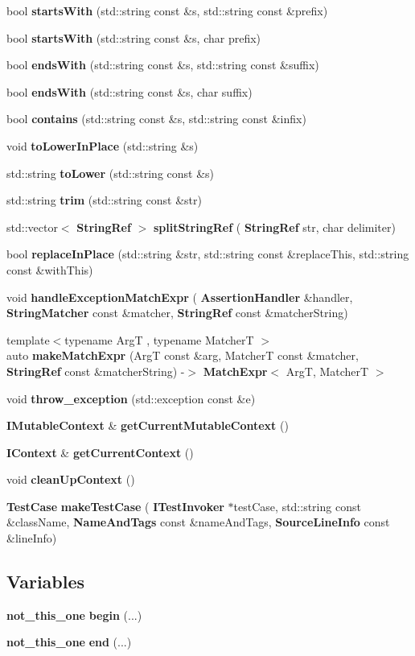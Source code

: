 \begin{DoxyCompactItemize}
bool \textbf{ starts\+With} (std\+::string const \&s, std\+::string const \&prefix)
\item 
bool \textbf{ starts\+With} (std\+::string const \&s, char prefix)
\item 
bool \textbf{ ends\+With} (std\+::string const \&s, std\+::string const \&suffix)
\item 
bool \textbf{ ends\+With} (std\+::string const \&s, char suffix)
\item 
bool \textbf{ contains} (std\+::string const \&s, std\+::string const \&infix)
\item 
void \textbf{ to\+Lower\+In\+Place} (std\+::string \&s)
\item 
std\+::string \textbf{ to\+Lower} (std\+::string const \&s)
\item 
std\+::string \textbf{ trim} (std\+::string const \&str)
\item 
std\+::vector$<$ \textbf{ String\+Ref} $>$ \textbf{ split\+String\+Ref} (\textbf{ String\+Ref} str, char delimiter)
\item 
bool \textbf{ replace\+In\+Place} (std\+::string \&str, std\+::string const \&replace\+This, std\+::string const \&with\+This)
\item 
void \textbf{ handle\+Exception\+Match\+Expr} (\textbf{ Assertion\+Handler} \&handler, \textbf{ String\+Matcher} const \&matcher, \textbf{ String\+Ref} const \&matcher\+String)
\item 
{\footnotesize template$<$typename ArgT , typename MatcherT $>$ }\\auto \textbf{ make\+Match\+Expr} (ArgT const \&arg, MatcherT const \&matcher, \textbf{ String\+Ref} const \&matcher\+String) -\/$>$ \textbf{ Match\+Expr}$<$ ArgT, MatcherT $>$
\item 
void \textbf{ throw\+\_\+exception} (std\+::exception const \&e)
\item 
\textbf{ I\+Mutable\+Context} \& \textbf{ get\+Current\+Mutable\+Context} ()
\item 
\textbf{ I\+Context} \& \textbf{ get\+Current\+Context} ()
\item 
void \textbf{ clean\+Up\+Context} ()
\item 
\textbf{ Test\+Case} \textbf{ make\+Test\+Case} (\textbf{ I\+Test\+Invoker} $\ast$test\+Case, std\+::string const \&class\+Name, \textbf{ Name\+And\+Tags} const \&name\+And\+Tags, \textbf{ Source\+Line\+Info} const \&line\+Info)
\end{DoxyCompactItemize}
\subsection*{Variables}
\begin{DoxyCompactItemize}
\item 
\textbf{ not\+\_\+this\+\_\+one} \textbf{ begin} (...)
\item 
\textbf{ not\+\_\+this\+\_\+one} \textbf{ end} (...)
\end{DoxyCompactItemize}


